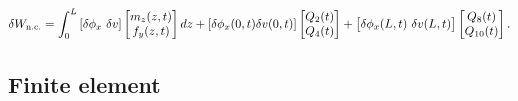 \documentclass{AeroStructure-ERJohnson}
\begin{document}
\begin{align}\label{eq18.138}
\delta W_{\text {n.c.}}=\int_{0}^{L}\left[\delta \phi_{x}~\delta v\right]\left[\begin{array}{@{}c@{}}m_{z}(z, t) \\f_{y}(z, t)\end{array}\right] d z+\left[\delta \phi_{x}(0, t) \delta v(0, t)\right]\left[\begin{array}{@{}l@{}}Q_{2}(t) \\Q_{4}(t)\end{array}\right]+\left[\begin{array}{@{}l@{}}\delta \phi_{x}(L, t)~\delta v(L, t)\end{array}\right]\left[\begin{array}{@{}c@{}}Q_{8}(t) \\Q_{10}(t)\end{array}\right].
\end{align}

\subsection{Finite element}\label{sec18.8.1}
\end{document}
